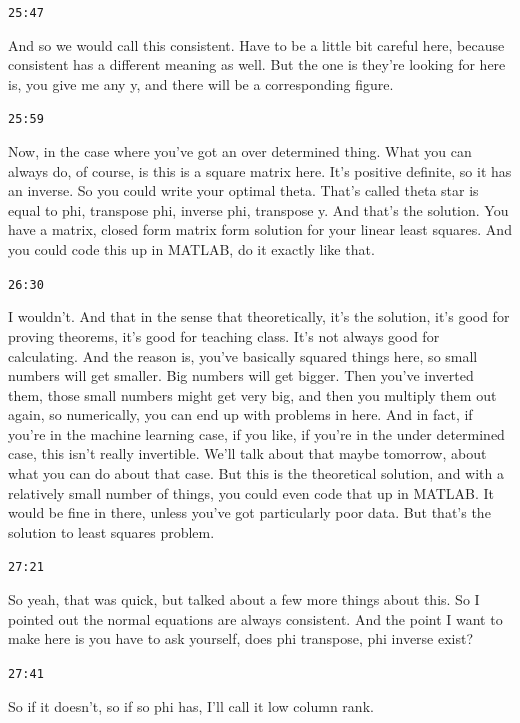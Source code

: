 \documentclass[11pt,a4paper]{article}
\newcommand{\timestamp}[1]{%
  \par\vspace{0.35em}%
  \noindent\colorbox{timestampback}{\textcolor{timestampblue}{\small\texttt{#1}}}%
  \par\vspace{0.2em}%
}
\begin{document}
\timestamp{25:47}

And so we would call this consistent. Have to be a little bit careful here, because consistent has a different meaning as well. But the one is they're looking for here is, you give me any y, and there will be a corresponding figure.



\timestamp{25:59}

Now, in the case where you've got an over determined thing. What you can always do, of course, is this is a square matrix here. It's positive definite, so it has an inverse. So you could write your optimal theta. That's called theta star is equal to phi, transpose phi, inverse phi, transpose y. And that's the solution. You have a matrix, closed form matrix form solution for your linear least squares. And you could code this up in MATLAB, do it exactly like that.



\timestamp{26:30}

I wouldn't. And that in the sense that theoretically, it's the solution, it's good for proving theorems, it's good for teaching class. It's not always good for calculating. And the reason is, you've basically squared things here, so small numbers will get smaller. Big numbers will get bigger. Then you've inverted them, those small numbers might get very big, and then you multiply them out again, so numerically, you can end up with problems in here. And in fact, if you're in the machine learning case, if you like, if you're in the under determined case, this isn't really invertible. We'll talk about that maybe tomorrow, about what you can do about that case. But this is the theoretical solution, and with a relatively small number of things, you could even code that up in MATLAB. It would be fine in there, unless you've got particularly poor data. But that's the solution to least squares problem.



\timestamp{27:21}

So yeah, that was quick, but talked about a few more things about this. So I pointed out the normal equations are always consistent. And the point I want to make here is you have to ask yourself, does phi transpose, phi inverse exist?



\timestamp{27:41}

So if it doesn't, so if so phi has, I'll call it low column rank.
\end{document}
